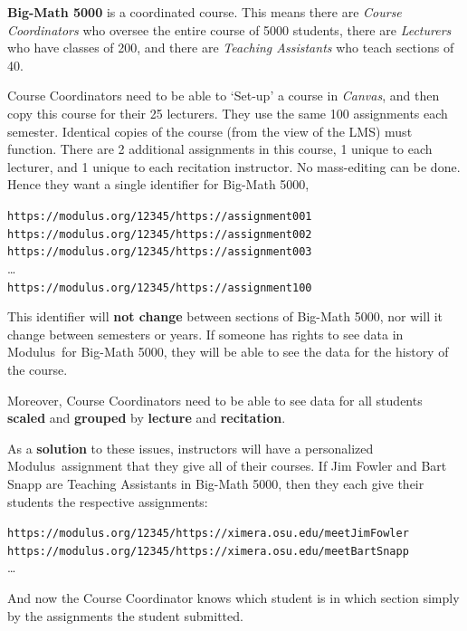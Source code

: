 \documentclass{techbrief}
\newcommand{\modulus}{\textsf{Modulus}}
\begin{document}
\break

\begin{xframe}
    \textbf{Big-Math 5000} is a coordinated course. This means there are
    \textit{Course Coordinators} who oversee the entire course of 5000
    students,
    there are \textit{Lecturers} who have classes of 200, and there are
    \textit{Teaching
        Assistants} who teach sections of 40.

    Course Coordinators need to be able to `Set-up' a course in
    \textsl{Canvas}, and then copy
    this course for their 25 lecturers. They use the same 100 assignments each
    semester. Identical copies of the course (from the view of the LMS) must
    function.  There are 2 additional assignments in this
    course, 1 unique to each lecturer, and 1 unique to each recitation
    instructor. No mass-editing can be done. Hence they want a single
    identifier for Big-Math 5000,
    \begin{center}\scriptsize
        \texttt{https://modulus.org/12345/https://assignment001}\\
        \texttt{https://modulus.org/12345/https://assignment002}\\
        \texttt{https://modulus.org/12345/https://assignment003}\\
        \dots\\
        \texttt{https://modulus.org/12345/https://assignment100}\\
    \end{center}
    This identifier will \textbf{not change} between sections of Big-Math 5000,
    nor will it change between semesters or years. If someone has rights to see
    data in \modulus\ for Big-Math 5000, they will be able to see the data for
    the history of the course.

    Moreover, Course Coordinators need to be able to see data for all students
    \textbf{scaled} and \textbf{grouped} by \textbf{lecture} and
    \textbf{recitation}.

    As a \textbf{solution} to these issues, instructors will have a
    personalized
    \modulus\ assignment that they give all of their courses. If Jim Fowler and
    Bart Snapp are Teaching Assistants in Big-Math 5000, then they each give
    their
    students the respective assignments:
    \begin{center}\scriptsize

        \texttt{https://modulus.org/12345/https://ximera.osu.edu/meetJimFowler}\\

        \texttt{https://modulus.org/12345/https://ximera.osu.edu/meetBartSnapp}\\
        \dots
    \end{center}
    And now the Course Coordinator knows which student is in which section
    simply by the assignments the student submitted.
\end{xframe}
\end{document}
